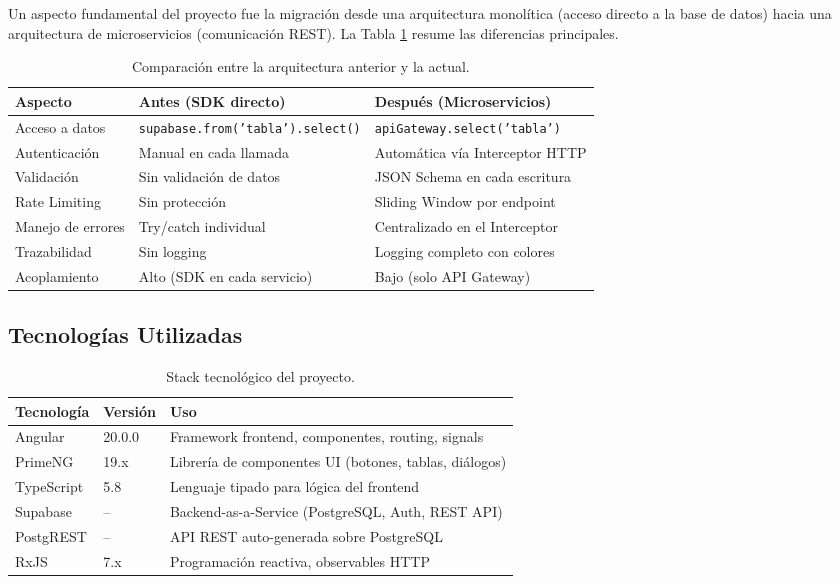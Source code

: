 \documentclass[12pt,a4paper]{article}
\begin{document}
Un aspecto fundamental del proyecto fue la migración desde una arquitectura monolítica (acceso directo a la base de datos) hacia una arquitectura de microservicios (comunicación REST). La Tabla \ref{tab:migracion} resume las diferencias principales.

\begin{table}[H]
    \centering
    \caption{Comparación entre la arquitectura anterior y la actual.}
    \label{tab:migracion}
    \begin{tabular}{@{}p{3.5cm}p{5cm}p{5cm}@{}}
        \toprule
        \textbf{Aspecto} & \textbf{Antes (SDK directo)} & \textbf{Después (Microservicios)} \\
        \midrule
        Acceso a datos & \texttt{supabase.from('tabla').select()} & \texttt{apiGateway.select('tabla')} \\
        Autenticación & Manual en cada llamada & Automática vía Interceptor HTTP \\
        Validación & Sin validación de datos & JSON Schema en cada escritura \\
        Rate Limiting & Sin protección & Sliding Window por endpoint \\
        Manejo de errores & Try/catch individual & Centralizado en el Interceptor \\
        Trazabilidad & Sin logging & Logging completo con colores \\
        Acoplamiento & Alto (SDK en cada servicio) & Bajo (solo API Gateway) \\
        \bottomrule
    \end{tabular}
\end{table}

\subsection{Tecnologías Utilizadas}

\begin{table}[H]
    \centering
    \caption{Stack tecnológico del proyecto.}
    \label{tab:tecnologias}
    \begin{tabular}{@{}llp{7cm}@{}}
        \toprule
        \textbf{Tecnología} & \textbf{Versión} & \textbf{Uso} \\
        \midrule
        Angular & 20.0.0 & Framework frontend, componentes, routing, signals \\
        PrimeNG & 19.x & Librería de componentes UI (botones, tablas, diálogos) \\
        TypeScript & 5.8 & Lenguaje tipado para lógica del frontend \\
        Supabase & -- & Backend-as-a-Service (PostgreSQL, Auth, REST API) \\
        PostgREST & -- & API REST auto-generada sobre PostgreSQL \\
        RxJS & 7.x & Programación reactiva, observables HTTP \\
        \bottomrule
    \end{tabular}
\end{table}
\end{document}
